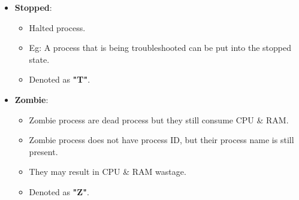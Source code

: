\begin{flushleft}
\begin{itemize}
		\bigskip
		\item \textbf{Stopped}: 
		\begin{itemize}
			\item Halted process.
			\item Eg: A process that is being troubleshooted can be put into the stopped state.
			\item Denoted as \textbf{"T"}.
		\end{itemize}
		
		\bigskip
		\item \textbf{Zombie}: 
		\begin{itemize}
			\item Zombie process are dead process but they still consume CPU \& RAM.
			\item Zombie process does not have process ID, but their process name is still present.
			\item They may result in CPU \& RAM wastage.
			\item Denoted as \textbf{"Z"}.
		\end{itemize}
		
		
		
	\end{itemize}


\end{flushleft}

\newpage


